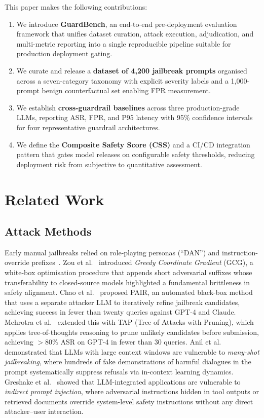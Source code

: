 \documentclass{mdpi}
\begin{document}
This paper makes the following contributions:

\begin{enumerate}
  \item We introduce \textbf{GuardBench}, an end-to-end pre-deployment
        evaluation framework that unifies dataset curation, attack execution,
        adjudication, and multi-metric reporting into a single reproducible
        pipeline suitable for production deployment gating.
  \item We curate and release a \textbf{dataset of 4,200 jailbreak prompts}
        organised across a seven-category taxonomy with explicit severity labels
        and a 1,000-prompt benign counterfactual set enabling FPR measurement.
  \item We establish \textbf{cross-guardrail baselines} across three
        production-grade LLMs, reporting ASR, FPR, and P95 latency with 95\%
        confidence intervals for four representative guardrail architectures.
  \item We define the \textbf{Composite Safety Score (CSS)} and a CI/CD
        integration pattern that gates model releases on configurable safety
        thresholds, reducing deployment risk from subjective to quantitative
        assessment.
\end{enumerate}

\section{Related Work}

\subsection{Attack Methods}

Early manual jailbreaks relied on role-playing personas (``DAN'') and
instruction-override prefixes~\cite{perez2022ignore}.  Zou et
al.~\cite{zou2023gcg} introduced \emph{Greedy Coordinate Gradient} (GCG), a
white-box optimisation procedure that appends short adversarial suffixes whose
transferability to closed-source models highlighted a fundamental brittleness
in safety alignment.  Chao et al.~\cite{chao2023pair} proposed PAIR, an
automated black-box method that uses a separate attacker LLM to iteratively
refine jailbreak candidates, achieving success in fewer than twenty queries
against GPT-4 and Claude.  Mehrotra et al.~\cite{mehrotra2024tap} extended
this with TAP (Tree of Attacks with Pruning), which applies tree-of-thoughts
reasoning to prune unlikely candidates before submission, achieving $>$80\%
ASR on GPT-4 in fewer than 30 queries.  Anil et al.~\cite{anil2024manyshot}
demonstrated that LLMs with large context windows are vulnerable to
\emph{many-shot jailbreaking}, where hundreds of fake demonstrations of
harmful dialogues in the prompt systematically suppress refusals via
in-context learning dynamics.  Greshake et al.~\cite{greshake2023indirect}
showed that LLM-integrated applications are vulnerable to \emph{indirect
prompt injection}, where adversarial instructions hidden in tool outputs
or retrieved documents override system-level safety instructions without
any direct attacker--user interaction.
\end{document}
